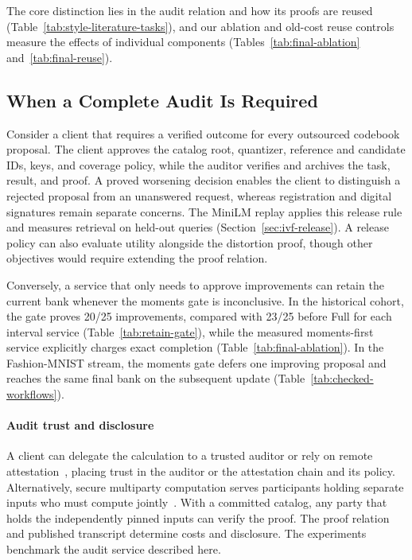 \documentclass[5p,times,twocolumn]{elsarticle}
\begin{document}
The core distinction lies in the audit relation and how its proofs are reused (Table~\ref{tab:style-literature-tasks}), and our ablation and old-cost reuse controls measure the effects of individual components (Tables~\ref{tab:final-ablation} and~\ref{tab:final-reuse}).

\subsection{When a Complete Audit Is Required}
\label{sec:discussion-obligation}
Consider a client that requires a verified outcome for every outsourced codebook proposal. The client approves the catalog root, quantizer, reference and candidate IDs, keys, and coverage policy, while the auditor verifies and archives the task, result, and proof. A proved worsening decision enables the client to distinguish a rejected proposal from an unanswered request, whereas registration and digital signatures remain separate concerns. The MiniLM replay applies this release rule and measures retrieval on held-out queries (Section~\ref{sec:ivf-release}). A release policy can also evaluate utility alongside the distortion proof, though other objectives would require extending the proof relation.

Conversely, a service that only needs to approve improvements can retain the current bank whenever the moments gate is inconclusive. In the historical cohort, the gate proves 20/25 improvements, compared with 23/25 before Full for each interval service (Table~\ref{tab:retain-gate}), while the measured moments-first service explicitly charges exact completion (Table~\ref{tab:final-ablation}). In the Fashion-MNIST stream, the moments gate defers one improving proposal and reaches the same final bank on the subsequent update (Table~\ref{tab:checked-workflows}).

\paragraph{Audit trust and disclosure}
A client can delegate the calculation to a trusted auditor or rely on remote attestation~\cite{rfc9334rats}, placing trust in the auditor or the attestation chain and its policy. Alternatively, secure multiparty computation serves participants holding separate inputs who must compute jointly~\cite{nistpecmpc}. With a committed catalog, any party that holds the independently pinned inputs can verify the proof. The proof relation and published transcript determine costs and disclosure. The experiments benchmark the audit service described here.
\end{document}
